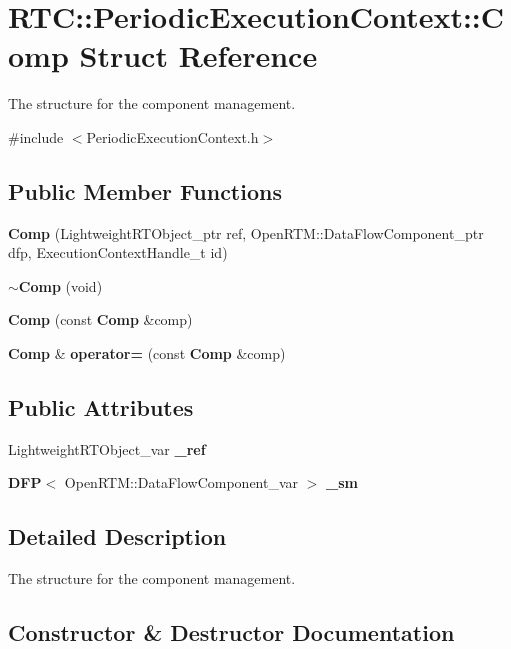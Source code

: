 \section{RTC::PeriodicExecutionContext::Comp Struct Reference}
\label{structRTC_1_1PeriodicExecutionContext_1_1Comp}


The structure for the component management.  




{\ttfamily \#include $<$PeriodicExecutionContext.h$>$}

\subsection*{Public Member Functions}
\begin{DoxyCompactItemize}
\item 
{\bf Comp} (LightweightRTObject\_\-ptr ref, OpenRTM::DataFlowComponent\_\-ptr dfp, ExecutionContextHandle\_\-t id)
\item 
{\bf $\sim$Comp} (void)
\item 
{\bf Comp} (const {\bf Comp} \&comp)
\item 
{\bf Comp} \& {\bf operator=} (const {\bf Comp} \&comp)
\end{DoxyCompactItemize}
\subsection*{Public Attributes}
\begin{DoxyCompactItemize}
\item 
LightweightRTObject\_\-var {\bf \_\-ref}
\item 
{\bf DFP}$<$ OpenRTM::DataFlowComponent\_\-var $>$ {\bf \_\-sm}
\end{DoxyCompactItemize}


\subsection{Detailed Description}
The structure for the component management. 

\subsection{Constructor \& Destructor Documentation}
